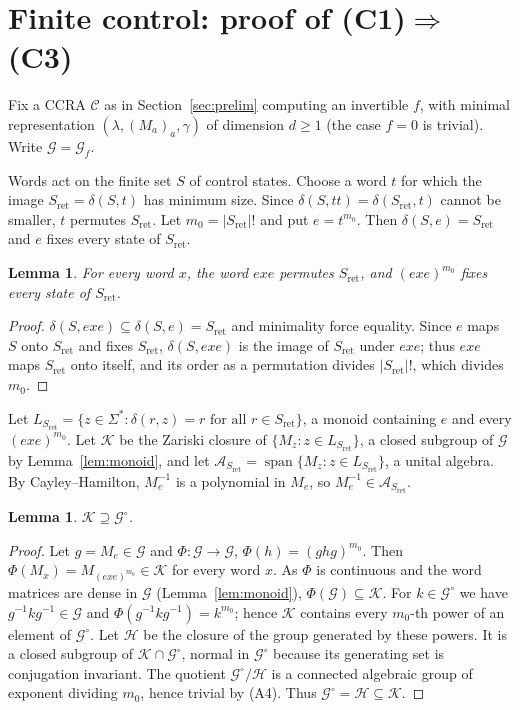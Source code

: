 \documentclass[11pt,letterpaper]{article}
\newcommand{\cG}{\mathcal{G}}
\newcommand{\cK}{\mathcal{K}}
\newcommand{\cH}{\mathcal{H}}
\newcommand{\cA}{\mathcal{A}}
\newcommand{\spn}{\operatorname{span}}
\newtheorem{lemma}[theorem]{Lemma}
\theoremstyle{definition}
\begin{document}
\section{Finite control: proof of (C1)\texorpdfstring{$\Rightarrow$}{=>}(C3)}\label{sec:control}
Fix a CCRA $\mathcal C$ as in Section~\ref{sec:prelim} computing an invertible $f$, with minimal representation $(\lambda,(M_a)_a,\gamma)$ of dimension $d\ge1$ (the case $f=0$ is trivial). Write $\cG=\cG_f$.

Words act on the finite set $S$ of control states. Choose a word $t$ for which the image ${S_{\mathrm{ret}}}=\delta(S,t)$ has minimum size. Since $\delta(S,tt)=\delta({S_{\mathrm{ret}}},t)$ cannot be smaller, $t$ permutes ${S_{\mathrm{ret}}}$. Let $m_0=|{S_{\mathrm{ret}}}|!$ and put $e=t^{m_0}$. Then $\delta(S,e)={S_{\mathrm{ret}}}$ and $e$ fixes every state of ${S_{\mathrm{ret}}}$.

\begin{lemma}\label{lem:return}
For every word $x$, the word $exe$ permutes ${S_{\mathrm{ret}}}$, and $(exe)^{m_0}$ fixes every state of ${S_{\mathrm{ret}}}$.
\end{lemma}
\begin{proof}
$\delta(S,exe)\subseteq\delta(S,e)={S_{\mathrm{ret}}}$ and minimality force equality. Since $e$ maps $S$ onto ${S_{\mathrm{ret}}}$ and fixes ${S_{\mathrm{ret}}}$, $\delta(S,exe)$ is the image of ${S_{\mathrm{ret}}}$ under $exe$; thus $exe$ maps ${S_{\mathrm{ret}}}$ onto itself, and its order as a permutation divides $|{S_{\mathrm{ret}}}|!$, which divides $m_0$.
\end{proof}

Let $L_{S_{\mathrm{ret}}}=\{z\in\Sigma^*:\delta(r,z)=r\text{ for all }r\in {S_{\mathrm{ret}}}\}$, a monoid containing $e$ and every $(exe)^{m_0}$. Let $\cK$ be the Zariski closure of $\{M_z:z\in L_{S_{\mathrm{ret}}}\}$, a closed subgroup of $\cG$ by Lemma~\ref{lem:monoid}, and let $\cA_{S_{\mathrm{ret}}}=\spn\{M_z:z\in L_{S_{\mathrm{ret}}}\}$, a unital algebra. By Cayley--Hamilton, $M_e^{-1}$ is a polynomial in $M_e$, so $M_e^{-1}\in\cA_{S_{\mathrm{ret}}}$.

\begin{lemma}\label{lem:dense}
$\cK\supseteq\cG^\circ$.
\end{lemma}
\begin{proof}
Let $g=M_e\in\cG$ and $\Phi:\cG\to\cG$, $\Phi(h)=(ghg)^{m_0}$. Then $\Phi(M_x)=M_{(exe)^{m_0}}\in\cK$ for every word $x$. As $\Phi$ is continuous and the word matrices are dense in $\cG$ (Lemma~\ref{lem:monoid}), $\Phi(\cG)\subseteq\cK$. For $k\in\cG^\circ$ we have $g^{-1}kg^{-1}\in\cG$ and $\Phi(g^{-1}kg^{-1})=k^{m_0}$; hence $\cK$ contains every $m_0$-th power of an element of $\cG^\circ$. Let $\cH$ be the closure of the group generated by these powers. It is a closed subgroup of $\cK\cap\cG^\circ$, normal in $\cG^\circ$ because its generating set is conjugation invariant. The quotient $\cG^\circ/\cH$ is a connected algebraic group of exponent dividing $m_0$, hence trivial by (A4). Thus $\cG^\circ=\cH\subseteq\cK$.
\end{proof}
\end{document}

